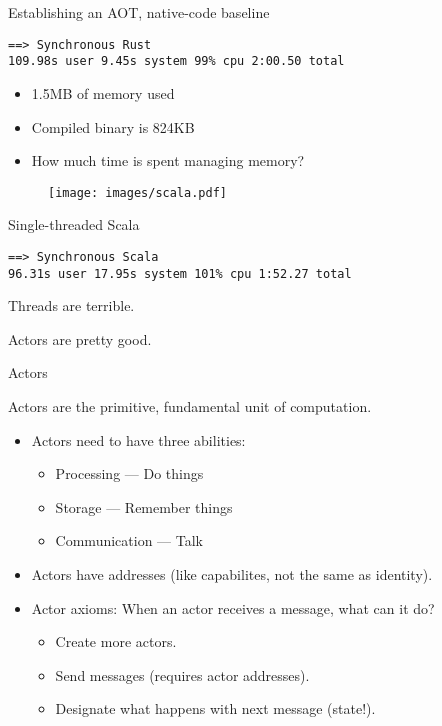 \documentclass[aspectratio=169]{beamer}
\newcommand{\megatext}[1]{
  \begin{center}
    \Huge
    #1
  \end{center}
}
\begin{document}
\begin{frame}[fragile]{Establishing an AOT, native-code baseline}
    \begin{verbatim}
==> Synchronous Rust
109.98s user 9.45s system 99% cpu 2:00.50 total
    \end{verbatim}

    \begin{itemize}
      \item 1.5MB of memory used
      \item Compiled binary is 824KB
      \item How much time is spent managing memory?
    \end{itemize}
\end{frame}


\begin{frame}
  \begin{figure}
    \texttt{[image: images/scala.pdf]}
  \end{figure}
\end{frame}


\begin{frame}[fragile]{Single-threaded Scala}
  \begin{verbatim}
==> Synchronous Scala
96.31s user 17.95s system 101% cpu 1:52.27 total
  \end{verbatim}
\end{frame}

\begin{frame}
  \megatext{Threads are terrible.}
\end{frame}


\begin{frame}
  \megatext{Actors are pretty good.}
\end{frame}


\begin{frame}{Actors}

  Actors are the primitive, fundamental unit of computation.

  \begin{itemize}
  \item Actors need to have three abilities:
    \begin{itemize}
    \item Processing --- Do things
    \item Storage --- Remember things
    \item Communication --- Talk
    \end{itemize}

  \item Actors have addresses (like capabilites, not the same as identity).

  \item Actor axioms: When an actor receives a message, what can it do?
    \begin{itemize}
    \item Create more actors.
    \item Send messages (requires actor addresses).
    \item Designate what happens with next message (state!).
    \end{itemize}
  \end{itemize}
\end{frame}
\end{document}
